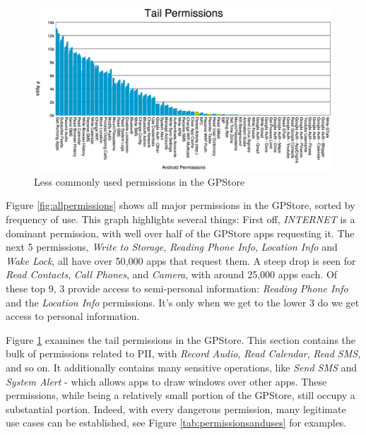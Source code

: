 \begin{figure}[t]
\begin{center}
\includegraphics[width=1.0\columnwidth]{figs/AllPermissions_Tail}
\caption{Less commonly used permissions in the GPStore}
\label{fig:tailpermissions}
\end{center}
\end{figure}

Figure \ref{fig:allpermissions} shows all major permissions in the GPStore, sorted by frequency of use. This graph highlights several things: First off, \textit{INTERNET} is a dominant permission, with well over half of the GPStore apps requesting it. The next 5 permissions, \textit{Write to Storage}, \textit{Reading Phone Info}, \textit{Location Info} and \textit{Wake Lock}, all have over 50,000 apps that request them. A steep drop is seen for \textit{Read Contacts}, \textit{Call Phones}, and \textit{Camera}, with around 25,000 apps each. Of these top 9, 3 provide access to semi-personal information: \textit{Reading Phone Info} and the \textit{Location Info} permissions. It's only when we get to the lower 3 do we get access to personal information. 

Figure \ref{fig:tailpermissions} examines the tail permissions in the GPStore. This section contains the bulk of permissions related to PII, with \textit{Record Audio}, \textit{Read Calendar}, \textit{Read SMS}, and so on. It additionally contains many sensitive operations, like \textit{Send SMS} and \textit{System Alert} - which allows apps to draw windows over other apps. These permissions, while being a relatively small portion of the GPStore, still occupy a substantial portion. Indeed, with every dangerous permission, many legitimate use cases can be established, see Figure \ref{tab:permissionsanduses} for examples.

